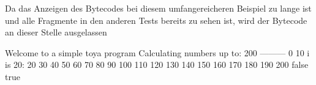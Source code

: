 Da das Anzeigen des Bytecodes bei diesem umfangereicheren Beispiel zu lange ist und alle Fragmente in den anderen Tests bereits zu sehen ist, wird der Bytecode an dieser Stelle ausgelassen

\begin{ToyaCode}[numbers=none, caption={Konsolen-Ausgabe des umfangereicheren Beispiels}]
Welcome to a simple toya program
Calculating numbers up to:
200
---------
0
10
i is 20:
20
30
40
50
60
70
80
90
100
110
120
130
140
150
160
170
180
190
200
false
true    
\end{ToyaCode}